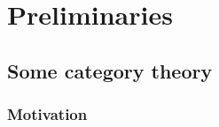 \documentclass[11pt,fleqn]{book} %
\begin{document}


\pagestyle{empty} %

\tableofcontents %

\cleardoublepage %

\pagestyle{fancy} %


\part{Preliminaries}


%
\chapter{Some category theory}

\section{Motivation}
\end{document}
